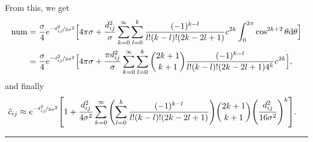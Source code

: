 \documentclass{article}
\begin{document}
\raggedright
\vspace{10pt}
From this, we get
\begin{align*}
    \text{num} &= \frac{\sigma}{4} e^{\nicefrac{-d_{ij}^2}{2\sigma^2}}\Big[4\pi\sigma + \frac{d_{ij}^2}{\sigma}\sum_{k=0}^\infty\sum_{l=0}^k\frac{(-1)^{k-l}}{l!(k-l)!(2k-2l+1)}c^{2k}\int_{0}^{2\pi}\cos^{2k+2}\theta\dd\theta \Big]\\
    &= \frac{\sigma}{4} e^{\nicefrac{-d_{ij}^2}{2\sigma^2}}\Big[4\pi\sigma + \frac{\pi d_{ij}^2}{\sigma}\sum_{k=0}^\infty\sum_{l=0}^k\binom{2k+1}{k+1}\frac{(-1)^{k-l}}{l!(k-l)!(2k-2l+1)4^{k}}c^{2k} \Big],
\end{align*}
and finally
\begin{align}
    \Tilde{c}_{ij} &\approx e^{\nicefrac{-d_{ij}^2}{2\sigma^2}}\qty[1+\frac{d_{ij}^2}{4\sigma^2}\sum_{k=0}^\infty\qty(\sum_{l=0}^k\frac{(-1)^{k-l}}{l!(k-l)!(2k-2l+1)})\binom{2k+1}{k+1}\qty(\frac{d_{ij}^2}{16\sigma^2})^{k}].
    \label{eq:induced_correlations_series}
\end{align}
\centering
\rule{0.66\textwidth}{0.4pt}
\raggedright
\end{document}
